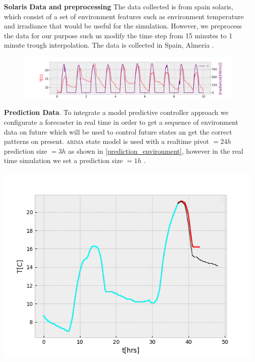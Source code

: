       \textbf{Solaris Data and preprocessing} The data collected is from 
      spain solaris, which consist of a set of environment features such as
      environment temperature and irradiance that would be useful for the 
      simulation. However, we preprocess the data for our purpose such us
      modify the time step from 15 minutes to 1 minute trough interpolation. 
      The data is collected in Spain, Almeria \cite{solargis}.

      \begin{figure}[!hbt]
        \centering
        \includegraphics[width=1.2\linewidth]{images/solaris2}
        \captionsetup{format=hang}
      \end{figure}
      \clearpage
      
      \textbf{Prediction Data}.
      To integrate a model predictive controller approach we configurate
      a forecaster in real time in order to get a sequence of environment data
      on future which will be used to control future states an get the correct
      patterns on present. \textsc{arima} state model is used with a realtime 
      pivot $= 24h$ prediction size $ = 3h$ as shown in \autoref{prediction_environment}, 
      however in the real time simulation we set a prediction size $=1h$ 
       \cite{jain2017study}.

      \begin{minipage}{\linewidth}
        \begin{center}
            \includegraphics[width=0.7\linewidth]{images/prediction}
            \label{prediction_environment}
        \end{center}
      \end{minipage}

